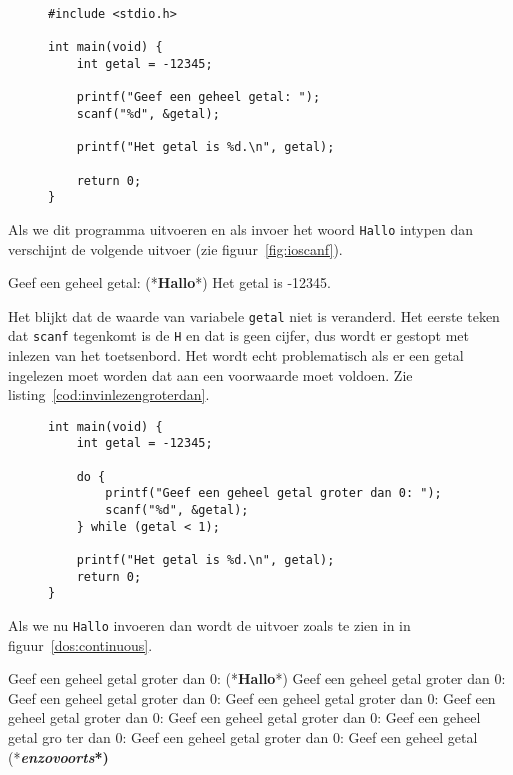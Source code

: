 \begin{figure}[H]
\begin{lstlisting}[caption=Getal inlezen met \texttt{scanf}.]
#include <stdio.h>

int main(void) {
    int getal = -12345;

    printf("Geef een geheel getal: ");
    scanf("%d", &getal);

    printf("Het getal is %d.\n", getal);

    return 0;
}
\end{lstlisting}
\end{figure}

Als we dit programma uitvoeren en als invoer het woord \texttt{Hallo} intypen dan verschijnt de volgende uitvoer (zie figuur~\ref{fig:ioscanf}).

\begin{dosbox}[title=Invoer van een heel getal.,label=fig:ioscanf]
Geef een geheel getal: (*\textbf{Hallo}*)
Het getal is -12345.
\end{dosbox}

Het blijkt dat de waarde van variabele \texttt{getal} niet is veranderd. Het eerste teken dat \texttt{scanf} tegenkomt is de \texttt{H} en dat is geen cijfer, dus wordt er gestopt met inlezen van het toetsenbord. Het wordt echt problematisch als er een getal ingelezen moet worden dat aan een voorwaarde moet voldoen. Zie listing~\ref{cod:invinlezengroterdan}.

\begin{figure}[!ht]
\begin{lstlisting}[caption=Het inlezen van een geheel getal dat groter is dan 0.,label=cod:invinlezengroterdan]
int main(void) {
    int getal = -12345;

    do {
        printf("Geef een geheel getal groter dan 0: ");
        scanf("%d", &getal);
    } while (getal < 1);

    printf("Het getal is %d.\n", getal);
    return 0;
}
\end{lstlisting}
\end{figure}
Als we nu \texttt{Hallo} invoeren dan wordt de uitvoer zoals te zien in in figuur~\ref{dos:continuous}.

\begin{dosbox}[title=Uivoer van het programma na invoer van een string.,label=dos:continuous]
Geef een geheel getal groter dan 0: (*\textbf{Hallo}*)
Geef een geheel getal groter dan 0: Geef een geheel getal groter dan
0: Geef een geheel getal groter dan 0: Geef een geheel getal groter 
dan 0: Geef een geheel getal groter dan 0: Geef een geheel getal gro
ter dan 0: Geef een geheel getal groter dan 0: Geef een geheel getal
(*\bfseries\textsl{\textrm{enzovoorts}}*)
\end{dosbox}

